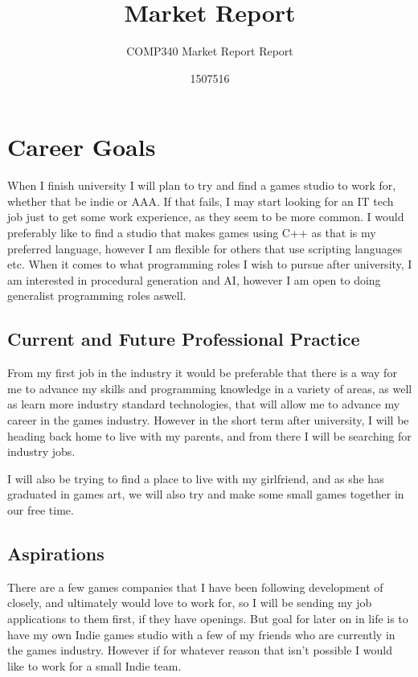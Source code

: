 \documentclass{scrartcl}
\title{Market Report}
\subtitle{COMP340 Market Report Report}
\author{1507516}
\begin{document}
\maketitle


\section{Career Goals}


When I finish university I will plan to try and find a games studio to work for, whether that be indie or AAA. If that fails, I may start looking for an IT tech job just to get some work experience, as they seem to be more common.
I would preferably like to find a studio that makes games using C++ as that is my preferred language, however I am flexible for others that use scripting languages etc.
When it comes to what programming roles I wish to pursue after university, I am interested in procedural generation and AI, however I am open to doing generalist programming roles aswell.


\subsection{Current and Future Professional Practice}
From my first job in the industry it would be preferable that there is a way for me to advance my skills and programming knowledge in a variety of areas, as well as learn more industry standard technologies, that will allow me to advance my career in the games industry. 
However in the short term after university, I will be heading back home to live with my parents, and from there I will be searching for industry jobs.

I will also be trying to find a place to live with my girlfriend, and as she has graduated in games art, we will also try and make some small games together in our free time.



\subsection{Aspirations} 
There are a few games companies that I have been following development of closely, and ultimately would love to work for, so I will be sending my job applications to them first, if they have openings.
But goal for later on in life is to have my own Indie games studio with a few of my friends who are currently in the games industry. However if for whatever reason that isn't possible I would like to work for a small Indie team.
\end{document}
